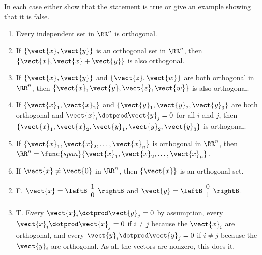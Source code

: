 \begin{multicols}{2}
\begin{ex}
In each case either show that the statement is true or give an example showing that it is false.

\begin{enumerate}[label={\alph*.}]
\item Every independent set in $\RR^n$ is orthogonal.

\item If $\{\vect{x}, \vect{y}\}$ is an orthogonal set in $\RR^n$, then $\{\vect{x}, \vect{x} + \vect{y}\}$ is also orthogonal.

\item If $\{\vect{x}, \vect{y}\}$ and $\{\vect{z}, \vect{w}\}$ are both orthogonal in $\RR^n$, then $\{\vect{x}, \vect{y}, \vect{z}, \vect{w}\}$ is also orthogonal.

\item If $\{\vect{x}_{1}, \vect{x}_{2}\}$ and $\{\vect{y}_{1}, \vect{y}_{2}, \vect{y}_{3}\}$ are both orthogonal and $\vect{x}_{i} \dotprod \vect{y}_{j} = 0$ for all $i$ and $j$, then $\{\vect{x}_{1}, \vect{x}_{2}, \vect{y}_{1}, \vect{y}_{2}, \vect{y}_{3}\}$ is orthogonal.

\item If $\{\vect{x}_{1}, \vect{x}_{2}, \dots, \vect{x}_{n}\}$ is orthogonal in $\RR^n$, then $\RR^n = \func{span}\{\vect{x}_{1}, \vect{x}_{2}, \dots, \vect{x}_{n}\}$.

\item If $\vect{x} \neq \vect{0}$ in $\RR^n$, then $\{\vect{x}\}$ is an orthogonal set.

\end{enumerate}
\begin{sol}
\begin{enumerate}[label={\alph*.}]
\setcounter{enumi}{1}
\item  F. $\vect{x} = 
\leftB \begin{array}{r}
1\\
0
\end{array} \rightB$ and $\vect{y} = 
\leftB \begin{array}{r}
0\\
1
\end{array} \rightB$.

\setcounter{enumi}{3}
\item  T. Every $\vect{x}_{i} \dotprod \vect{y}_{j} = 0$ by assumption, every $\vect{x}_{i} \dotprod \vect{x}_{j} = 0$ if $i \neq j$ because the $\vect{x}_{i}$ are orthogonal, and every $\vect{y}_{i} \dotprod \vect{y}_{j} = 0$ if $i \neq j$ because the $\vect{y}_{i}$ are orthogonal. As all the vectors are nonzero, this does it.


\end{enumerate}
\end{sol}
\end{ex}
\end{multicols}
